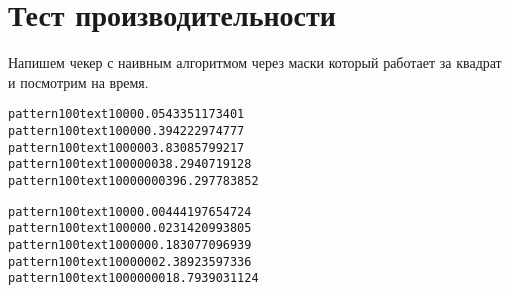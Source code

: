 \section{Тест производительности}

Напишем чекер с наивным алгоритмом через маски который работает за квадрат и посмотрим на время.

\begin{alltt}

pattern 100 text 1000 0.0543351173401
pattern 100 text 10000 0.394222974777
pattern 100 text 100000 3.83085799217
pattern 100 text 1000000 38.2940719128
pattern 100 text 10000000 396.297783852

pattern 100 text 1000 0.00444197654724
pattern 100 text 10000 0.0231420993805
pattern 100 text 100000 0.183077096939
pattern 100 text 1000000 2.38923597336
pattern 100 text 10000000 18.7939031124

\end{alltt}
\pagebreak
